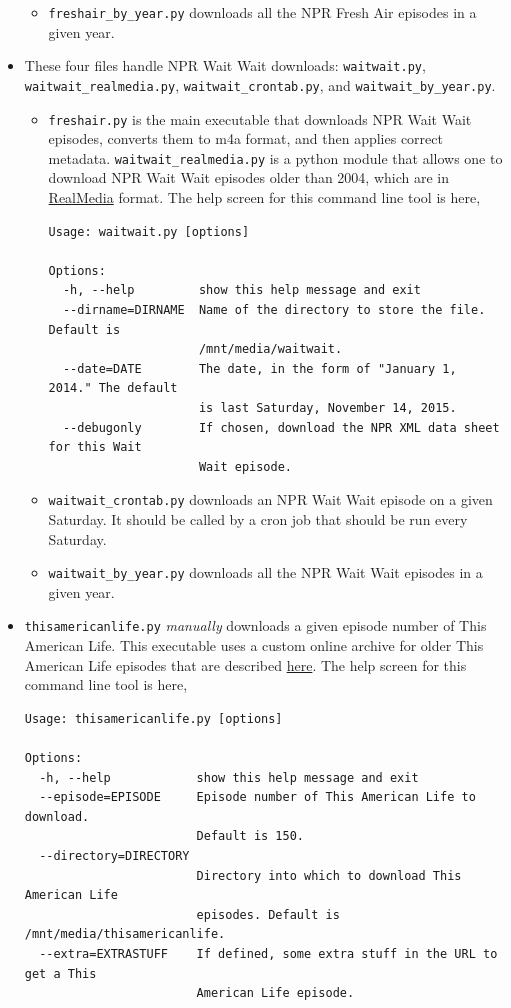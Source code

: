 \documentclass[]{article}
\begin{document}
\begin{itemize}
\begin{itemize}
    \item {\verb|freshair_by_year.py|} downloads all the NPR Fresh Air episodes in a given year.
  \end{itemize}
  
  \item These four files handle NPR Wait Wait downloads: {\verb|waitwait.py|}, {\verb|waitwait_realmedia.py|}, {\verb|waitwait_crontab.py|}, and {\verb|waitwait_by_year.py|}.
  \begin{itemize}
   \item {\verb|freshair.py|} is the main executable that downloads NPR Wait Wait episodes, converts them to m4a format, and then applies correct metadata. {\verb|waitwait_realmedia.py|} is a python module that allows one to download NPR Wait Wait episodes older than 2004, which are in \href{https://en.wikipedia.org/wiki/RealMedia}{RealMedia} format. The help screen for this command line tool is here,
\begin{verbatim}
Usage: waitwait.py [options]

Options:
  -h, --help         show this help message and exit
  --dirname=DIRNAME  Name of the directory to store the file. Default is
                     /mnt/media/waitwait.
  --date=DATE        The date, in the form of "January 1, 2014." The default
                     is last Saturday, November 14, 2015.
  --debugonly        If chosen, download the NPR XML data sheet for this Wait
                     Wait episode.
\end{verbatim}
   
   \item {\verb|waitwait_crontab.py|} downloads an NPR Wait Wait episode on a given Saturday. It should be called by a cron job that should be run every Saturday.
   
   \item {\verb|waitwait_by_year.py|} downloads all the NPR Wait Wait episodes in a given year.
  \end{itemize}

  \item {\verb|thisamericanlife.py|} \textit{manually} downloads a given episode number of This American Life. This executable uses a custom online archive for older This American Life episodes that are described \href{http://www.dirtygreek.org/t/download-this-american-life-episodes}{here}. The help screen for this command line tool is here,
\begin{verbatim}
Usage: thisamericanlife.py [options]

Options:
  -h, --help            show this help message and exit
  --episode=EPISODE     Episode number of This American Life to download.
                        Default is 150.
  --directory=DIRECTORY
                        Directory into which to download This American Life
                        episodes. Default is /mnt/media/thisamericanlife.
  --extra=EXTRASTUFF    If defined, some extra stuff in the URL to get a This
                        American Life episode.
\end{verbatim}
\end{itemize}
\end{document}
